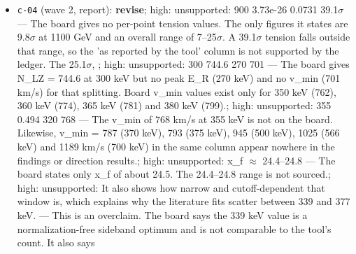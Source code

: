 \documentclass[11pt,a4paper]{article}
\begin{document}
\begin{itemize}
  \item \texttt{c-04} (wave 2, report): \textbf{revise}; high: unsupported: \textbar{} 900 \textbar{} 3.73e-26 \textbar{} 0.0731 \textbar{} 39.1$\sigma$ \textbar{} --- The board gives no per-point tension values. The only figures it states are 9.8$\sigma$ at 1100 GeV and an overall range of 7--25$\sigma$. A 39.1$\sigma$ tension falls outside that range, so the 'as reported by the tool' column is not supported by the ledger. The 25.1$\sigma$, ; high: unsupported: \textbar{} 300 \textbar{} 744.6 \textbar{} 270 \textbar{} 701 \textbar{} --- The board gives N\_LZ = 744.6 at 300 keV but no peak E\_R (270 keV) and no v\_min (701 km/s) for that splitting. Board v\_min values exist only for 350 keV (762), 360 keV (774), 365 keV (781) and 380 keV (799).; high: unsupported: \textbar{} 355 \textbar{} 0.494 \textbar{} 320 \textbar{} 768 \textbar{} --- The v\_min of 768 km/s at 355 keV is not on the board. Likewise, v\_min = 787 (370 keV), 793 (375 keV), 945 (500 keV), 1025 (566 keV) and 1189 km/s (700 keV) in the same column appear nowhere in the findings or direction results.; high: unsupported: x\_f $\approx$ 24.4--24.8 --- The board states only x\_f of about 24.5. The 24.4--24.8 range is not sourced.; high: unsupported: It also shows how narrow and cutoff-dependent that window is, which explains why the literature fits scatter between 339 and 377 keV. --- This is an overclaim. The board says the 339 keV value is a normalization-free sideband optimum and is not comparable to the tool's count. It also says

\end{itemize}
\end{document}
